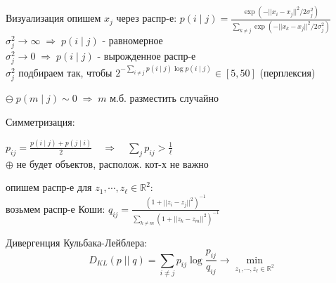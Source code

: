 \documentclass[final]{beamer}
\newlength{\colwidth}
\begin{document}
\begin{frame}[t]
\begin{columns}[t]
\begin{column}{\colwidth}
\begin{block}{Визуализация}
{\small опишем } $x_j$ {\small через распр-е: } $\displaystyle{p(i \; | \; j) = \frac{\exp(- ||x_i - x_j||^2 / 2 \sigma_j^2)}{\sum\limits_{k \ne j} \exp(- ||x_k - x_j||^2 / 2 \sigma_j^2)}}$\\
$\sigma_j^2 \to \infty \; \Rightarrow \; p(i \; | \; j)$ - {\small равномерное}\\
$\sigma_j^2 \to 0 \; \Rightarrow \; p(i \; | \; j)$ - {\small вырожденное распр-е}\\
$\sigma_j^2$ {\small подбираем так, чтобы } $2^{-\sum\limits_{i \ne j} p(i \; | \; j) \log p(i \; | \; j)} \in [5, 50]$ {\small (перплексия)}

$\ominus \; p(m \; | \; j) \sim 0 \; \Rightarrow \; m$ {\small м.б. разместить случайно}

{\small Симметризация:}

$\displaystyle{p_{ij} = \frac{p(i \; | \; j) + p(j \; | \; i)}{2} \quad \Rightarrow \quad \sum\limits_{j} p_{ij} > \frac{1}{\ell}}$\\
$\oplus$ {\small не будет объектов, располож. кот-х не важно }

{\small опишем распр-е для } $z_1, \cdots, z_{\ell} \in \mathbb{R}^2:$\\
{\small возьмем распр-е Коши: } $\displaystyle{q_{ij} = \frac{(1 + ||z_i - z_j||^2)^{-1}}{\sum\limits_{k \ne m} (1 + ||z_k - z_m||^2)^{-1}}}$

{\small Дивергенция Кульбака-Лейблера:}
\[D_{KL}(p \; || \; q) = \sum\limits_{i \ne j} p_{ij} \log \frac{p_{ij}}{q_{ij}} \to \min\limits_{z_1, \cdots, z_{\ell} \in \mathbb{R}^2}\]



\end{block}

\end{column}


\end{columns}
\end{frame}
\end{document}
